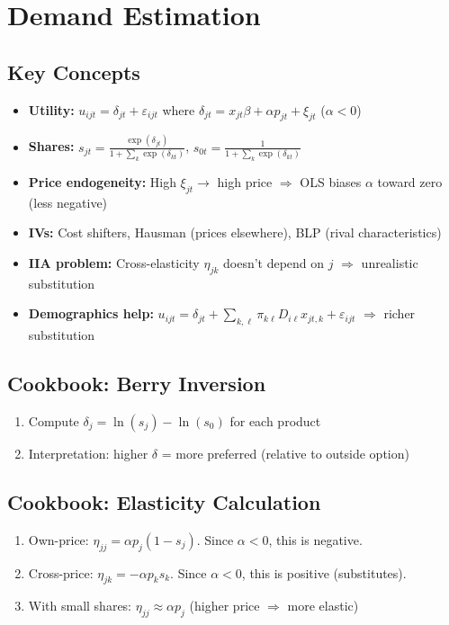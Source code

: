\documentclass[11pt]{article}
\begin{document}
\section{Demand Estimation}

\subsection{Key Concepts}
\begin{itemize}
	\item \textbf{Utility:} $u_{ijt} = \delta_{jt} + \varepsilon_{ijt}$ where $\delta_{jt} = x_{jt}\beta + \alpha p_{jt} + \xi_{jt}$ \quad ($\alpha < 0$)
	\item \textbf{Shares:} $s_{jt} = \frac{\exp(\delta_{jt})}{1 + \sum_{k} \exp(\delta_{kt})}$, \quad $s_{0t} = \frac{1}{1 + \sum_{k} \exp(\delta_{kt})}$
	\item \textbf{Price endogeneity:} High $\xi_{jt} \rightarrow$ high price $\Rightarrow$ OLS biases $\alpha$ toward zero (less negative)
	\item \textbf{IVs:} Cost shifters, Hausman (prices elsewhere), BLP (rival characteristics)
	\item \textbf{IIA problem:} Cross-elasticity $\eta_{jk}$ doesn't depend on $j$ $\Rightarrow$ unrealistic substitution
	\item \textbf{Demographics help:} $u_{ijt} = \delta_{jt} + \sum_{k,\ell} \pi_{k\ell} D_{i\ell} x_{jt,k} + \varepsilon_{ijt}$ $\Rightarrow$ richer substitution
\end{itemize}

\subsection{Cookbook: Berry Inversion}
\begin{enumerate}
	\item Compute $\delta_j = \ln(s_j) - \ln(s_0)$ for each product
	\item Interpretation: higher $\delta$ = more preferred (relative to outside option)
\end{enumerate}

\subsection{Cookbook: Elasticity Calculation}
\begin{enumerate}
	\item Own-price: $\eta_{jj} = \alpha p_j (1 - s_j)$. Since $\alpha < 0$, this is negative.
	\item Cross-price: $\eta_{jk} = -\alpha p_k s_k$. Since $\alpha < 0$, this is positive (substitutes).
	\item With small shares: $\eta_{jj} \approx \alpha p_j$ (higher price $\Rightarrow$ more elastic)
\end{enumerate}
\end{document}
